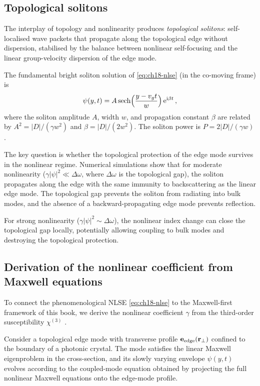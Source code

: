 \subsection{Topological solitons}
\label{sec:ch18-solitons}

The interplay of topology and nonlinearity produces \emph{topological
solitons}: self-localised wave packets that propagate along the
topological edge without dispersion, stabilised by the balance between
nonlinear self-focusing and the linear group-velocity dispersion of the
edge mode.

The fundamental bright soliton solution of \eqref{eq:ch18-nlse} (in the
co-moving frame) is
\begin{equation}\label{eq:ch18-soliton}
  \psi(y,t) = A\,\mathrm{sech}\Bigl(\frac{y-v_g t}{w}\Bigr)\,
  \mathrm{e}^{\mathrm{i}\beta t}\,,
\end{equation}
where the soliton amplitude $A$, width $w$, and propagation constant
$\beta$ are related by $A^2=|D|/(\gamma w^2)$ and
$\beta=|D|/(2w^2)$.  The soliton power is
$P=2|D|/(\gamma w)$.

The key question is whether the topological protection of the edge mode
survives in the nonlinear regime.  Numerical simulations show that for
moderate nonlinearity ($\gamma|\psi|^2\ll\Delta\omega$, where
$\Delta\omega$ is the topological gap), the soliton propagates along
the edge with the same immunity to backscattering as the linear edge
mode.  The topological gap prevents the soliton from radiating into
bulk modes, and the absence of a backward-propagating edge mode
prevents reflection.

For strong nonlinearity ($\gamma|\psi|^2\sim\Delta\omega$), the
nonlinear index change can close the topological gap locally,
potentially allowing coupling to bulk modes and destroying the
topological protection.

\subsection{Derivation of the nonlinear coefficient from Maxwell equations}
\label{sec:ch18-nlse-derivation}

To connect the phenomenological NLSE \eqref{eq:ch18-nlse} to the
Maxwell-first framework of this book, we derive the nonlinear
coefficient $\gamma$ from the third-order susceptibility
$\chi^{(3)}$ \cite{ozawa2018topological}.

Consider a topological edge mode with transverse profile
$\mathbf{e}_{\mathrm{edge}}(\mathbf{r}_\perp)$ confined to the boundary of
a photonic crystal.  The mode satisfies the linear Maxwell eigenproblem
in the cross-section, and its slowly varying envelope $\psi(y,t)$
evolves according to the coupled-mode equation obtained by projecting
the full nonlinear Maxwell equations onto the edge-mode profile.

